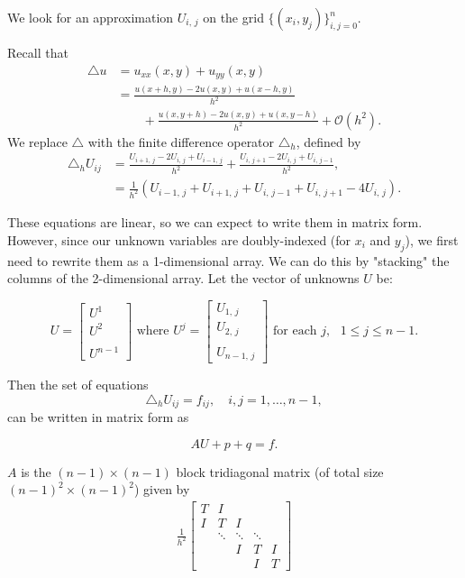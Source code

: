 We look for an approximation $U_{i,\,j}$ on the grid $\{(x_i,y_j)\}_{i,j=0}^{n}$.

Recall that
 \begin{align*}
 \triangle u &= u_{xx}(x,y) + u_{yy}(x,y) \\
&= \frac{u(x+h,y) - 2u(x,y)+ u(x-h,y)}{h^2} \\
 & \qquad{}+ 
 \frac{u(x,y+h) - 2u(x,y)+ u(x,y-h)}{h^2} + \mathcal{O}(h^2).
 \end{align*}
 We replace $\triangle $ with the finite difference operator $\triangle_h$, defined by
 \begin{align}
 \triangle_h U_{ij} &= \frac{U_{i+1,\,j} - 2U_{i,\,j} + U_{i-1,\,j}}{h^2} + \frac{U_{i,\,j+1} - 2U_{i,\,j}+ U_{i,\,j-1}}{h^2},\\
&= \frac{1}{h^2}(U_{i-1,\,j} + U_{i+1,\,j} + U_{i,\,j-1} + U_{i,\,j+1}-4U_{i,\,j}).
\label{eqn:finite_diff_op}
 \end{align}

These equations are linear, so we can expect to write them in matrix form. However, since our unknown variables are doubly-indexed (for $x_i$ and $y_j$), we first need to rewrite them as a 1-dimensional array. We can do this by "stacking" the columns of the 2-dimensional array. Let the vector of unknowns $U$ be:

\[U = \begin{bmatrix} U^1 \\ U^2 \\ \\ U^{n-1} \end{bmatrix} \text{ where } U^j = 
\begin{bmatrix} U_{1,\,j} \\ U_{2,\,j} \\ \\ U_{n-1,\,j} \end{bmatrix} \text{ for each } j, \text{ }1\leq j \leq n-1.\]

Then the set of equations  
\[
\triangle_h U_{ij} = f_{ij}, \quad i,j = 1,\ldots,n-1,
\]%
can be written in matrix form as

\begin{equation} \label{eqn:matrix_form}
AU + p +  q  = f.
\end{equation}


$A$ is the $(n-1) \times (n-1)$ block tridiagonal matrix (of total size $(n-1)^2 \times (n-1)^2$) given by 
\begin{align}
	\frac{1}{h^2}
\begin{bmatrix}
T & I & &  &\\
I &T & I & &\\
&\ddots  & \ddots & \ddots & \\
&  & I & T & I \\
&  &  & I & T\end{bmatrix}\label{poisson2d:matrixA}
\end{align}


